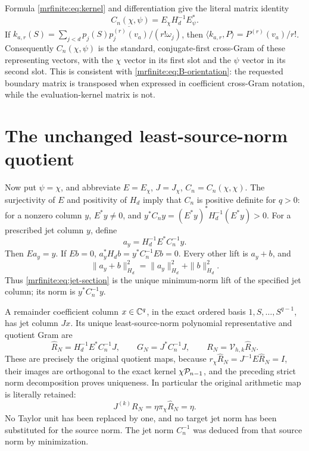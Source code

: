 \documentclass[11pt]{article}
\begin{document}
Formula \eqref{mrfinite:eq:kernel} and differentiation give the literal matrix
identity
\begin{equation}\label{mrfinite:eq:C-matrix}
 C_n(\chi,\psi)=E_\chi H_d^{-1}E_\psi^*.
\end{equation}
If \(k_{a,r}(S)=\sum_{j<d}p_j(S)
\overline{p_j^{(r)}(v_a)}/(r!\omega_j)\), then
\(\langle k_{a,r},P\rangle=P^{(r)}(v_a)/r!\).
Consequently \(C_n(\chi,\psi)\) is the standard, conjugate-first
cross-Gram of these representing vectors, with the \(\chi\) vector
in its first slot and the \(\psi\) vector in its second slot.
This is consistent with \eqref{mrfinite:eq:B-orientation}: the requested boundary
matrix is transposed when expressed in coefficient cross-Gram notation,
while the evaluation-kernel matrix is not.

\section{The unchanged least-source-norm quotient}\label{mrfinite:sec:quotient}

Now put \(\psi=\chi\), and abbreviate
\(E=E_\chi\), \(J=J_\chi\), \(C_n=C_n(\chi,\chi)\).
The surjectivity of \(E\) and positivity of \(H_d\) imply that \(C_n\)
is positive definite for \(q>0\): for a nonzero column \(y\),
\(E^*y\ne0\), and \(y^*C_ny=(E^*y)^*H_d^{-1}(E^*y)>0\).
For a prescribed jet column \(y\), define
\begin{equation}\label{mrfinite:eq:jet-section}
 a_y=H_d^{-1}E^*C_n^{-1}y.
\end{equation}
Then \(Ea_y=y\). If \(Eb=0\),
\(a_y^*H_db=y^*C_n^{-1}Eb=0\). Every other lift is \(a_y+b\), and
\[
 \|a_y+b\|_{H_d}^2=\|a_y\|_{H_d}^2+\|b\|_{H_d}^2.
\]
Thus \eqref{mrfinite:eq:jet-section} is the unique minimum-norm lift of the
specified jet column; its norm is \(y^*C_n^{-1}y\).

A remainder coefficient column \(x\in\mathbb C^q\), in the exact ordered basis
\(1,S,\ldots,S^{q-1}\), has jet column \(Jx\). Its unique
least-source-norm polynomial representative and quotient Gram are
\begin{equation}\label{mrfinite:eq:canonical-section}
 \widehat R_N=H_d^{-1}E^*C_n^{-1}J,\qquad
 G_N=J^*C_n^{-1}J,\qquad R_N=\mathcal V_{h,k}\widehat R_N.
\end{equation}
These are precisely the original quotient maps, because
\(r_\chi\widehat R_N=J^{-1}E\widehat R_N=I\), their images are
orthogonal to the exact kernel \(\chi\mathcal P_{n-1}\), and the preceding
strict norm decomposition proves uniqueness. In particular the
original arithmetic map is literally retained:
\[
 J^{(k)}R_N=\eta\pi_\chi\widehat R_N=\eta.
\]
No Taylor unit has been replaced by one, and no target jet norm has been
substituted for the source norm. The jet norm \(C_n^{-1}\) was deduced
from that source norm by minimization.
\end{document}
